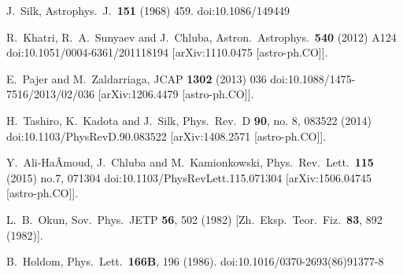 \documentclass[5p,times]{elsarticle}
\begin{document}
{\begin{thebibliography}{99}
  J.~Silk,
  Astrophys.\ J.\  {\bf 151} (1968) 459.
  doi:10.1086/149449




  R.~Khatri, R.~A.~Sunyaev and J.~Chluba,
  Astron.\ Astrophys.\  {\bf 540} (2012) A124
  doi:10.1051/0004-6361/201118194
  [arXiv:1110.0475 [astro-ph.CO]].
  
  E.~Pajer and M.~Zaldarriaga,
  JCAP {\bf 1302} (2013) 036
  doi:10.1088/1475-7516/2013/02/036
  [arXiv:1206.4479 [astro-ph.CO]].



  H.~Tashiro, K.~Kadota and J.~Silk,
  Phys.\ Rev.\ D {\bf 90}, no. 8, 083522 (2014)
  doi:10.1103/PhysRevD.90.083522
  [arXiv:1408.2571 [astro-ph.CO]].
  
  Y.~Ali-HaÂmoud, J.~Chluba and M.~Kamionkowski,
  Phys.\ Rev.\ Lett.\  {\bf 115} (2015) no.7,  071304
  doi:10.1103/PhysRevLett.115.071304
  [arXiv:1506.04745 [astro-ph.CO]].


  L.~B.~Okun,
  Sov.\ Phys.\ JETP {\bf 56}, 502 (1982)
  [Zh.\ Eksp.\ Teor.\ Fiz.\  {\bf 83}, 892 (1982)].

  B.~Holdom,
  Phys.\ Lett.\  {\bf 166B}, 196 (1986).
  doi:10.1016/0370-2693(86)91377-8


\end{thebibliography}}
\end{document}
